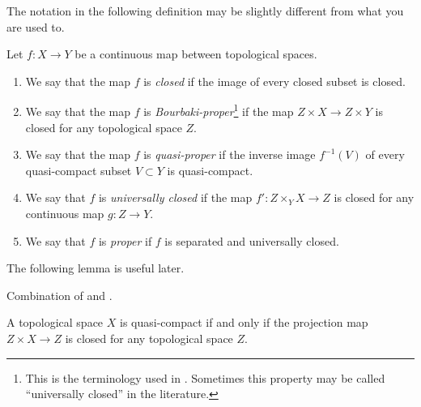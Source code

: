 \noindent
The notation in the following definition may be slightly different
from what you are used to.

\begin{definition}
\label{definition-proper-map}
Let $f : X\to Y$ be a continuous map between topological spaces.
\begin{enumerate}
\item We say that the map $f$ is {\it closed}
if the image of every closed subset is closed.
\item We say that the map $f$ is {\it Bourbaki-proper}\footnote{This is the
terminology used in \cite{Bourbaki}. Sometimes this property may be
called ``universally closed'' in the literature.} if the map
$Z \times X\to Z \times Y$ is closed for any topological space $Z$.
\item We say that the map $f$ is {\it quasi-proper} if
the inverse image $f^{-1}(V)$ of every quasi-compact subset $V \subset Y$
is quasi-compact.
\item We say that $f$ is {\it universally closed} if
the map $f': Z \times_Y X \to Z$ is closed for any continuous map $g: Z \to Y$.
\item We say that $f$ is {\it proper} if $f$ is separated
and universally closed.
\end{enumerate}
\end{definition}

\noindent
The following lemma is useful later.

\begin{lemma}
\label{lemma-characterize-quasi-compact}
\begin{reference}
Combination of
\cite[I, p. 75, Lemme 1]{Bourbaki} and
\cite[I, p. 76, Corrolaire 1]{Bourbaki}.
\end{reference}
A topological space $X$ is quasi-compact if and only if the
projection map $Z \times X \to Z$ is closed for
any topological space $Z$.
\end{lemma}

